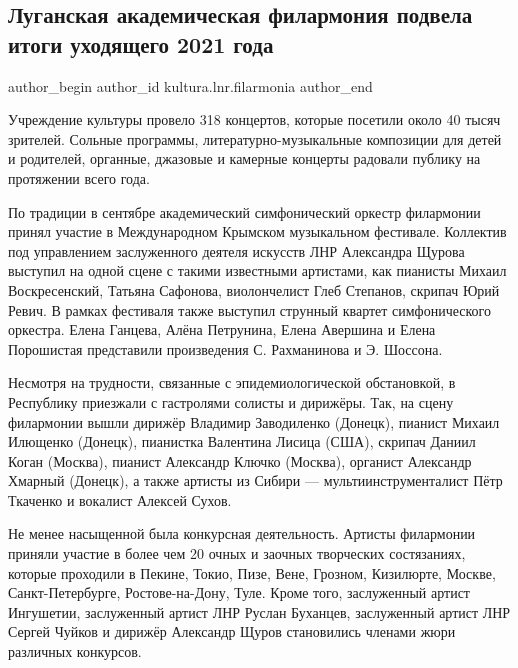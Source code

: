  
 
 
 
 
\subsection{Луганская академическая филармония подвела итоги уходящего 2021 года}
\label{sec:30_12_2021.stz.kultura.lnr.filarmonia.1.itogi_goda}

\ifcmt
 author_begin
   author_id kultura.lnr.filarmonia
 author_end
\fi

Учреждение культуры провело 318 концертов, которые посетили около 40 тысяч
зрителей. Сольные программы, литературно-музыкальные композиции для детей и
родителей, органные, джазовые и камерные концерты радовали публику на
протяжении всего года.   


По традиции в сентябре академический симфонический оркестр филармонии принял
участие в Международном Крымском музыкальном фестивале. Коллектив под
управлением заслуженного деятеля искусств ЛНР Александра Щурова выступил на
одной сцене с такими известными артистами, как пианисты Михаил Воскресенский,
Татьяна Сафонова, виолончелист Глеб Степанов, скрипач Юрий Ревич. В рамках
фестиваля также выступил струнный квартет симфонического оркестра. Елена
Ганцева, Алёна Петрунина, Елена Авершина и Елена Порошистая представили
произведения С. Рахманинова и Э. Шоссона.

Несмотря на трудности, связанные с эпидемиологической обстановкой, в Республику
приезжали с гастролями солисты и дирижёры. Так, на сцену филармонии вышли
дирижёр Владимир Заводиленко (Донецк), пианист Михаил Илющенко (Донецк),
пианистка Валентина Лисица (США), скрипач Даниил Коган (Москва), пианист
Александр Ключко (Москва), органист Александр Хмарный (Донецк), а также артисты
из Сибири — мультиинструменталист Пётр Ткаченко и вокалист Алексей Сухов.

Не менее насыщенной была конкурсная деятельность. Артисты филармонии приняли
участие в более чем 20 очных и заочных творческих состязаниях, которые
проходили в Пекине, Токио, Пизе, Вене, Грозном, Кизилюрте, Москве,
Санкт-Петербурге, Ростове-на-Дону, Туле. Кроме того, заслуженный артист
Ингушетии, заслуженный артист ЛНР Руслан Буханцев, заслуженный артист ЛНР
Сергей Чуйков и дирижёр Александр Щуров становились членами жюри различных
конкурсов.

